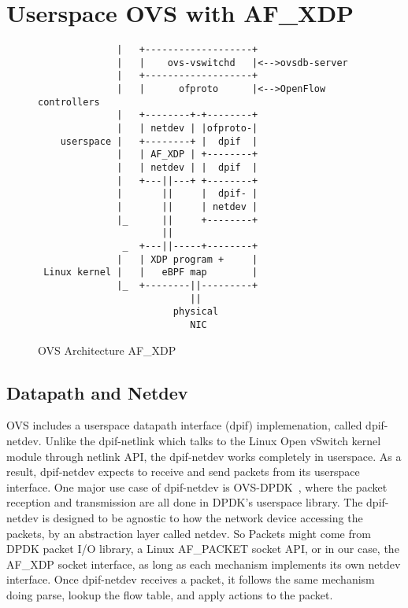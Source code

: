 \documentclass[10pt]{sigplanconf}
\begin{document}
\section{Userspace OVS with AF\_XDP}
\begin{figure}
{\scriptsize
\begin{verbatim}
              |   +-------------------+
              |   |    ovs-vswitchd   |<-->ovsdb-server
              |   +-------------------+
              |   |      ofproto      |<-->OpenFlow controllers
              |   +--------+-+--------+ 
              |   | netdev | |ofproto-|
    userspace |   +--------+ |  dpif  |
              |   | AF_XDP | +--------+
              |   | netdev | |  dpif  |
              |   +---||---+ +--------+
              |       ||     |  dpif- |
              |       ||     | netdev |
              |_      ||     +--------+  
                      ||         
               _  +---||-----+--------+
              |   | XDP program +     |
 Linux kernel |   |   eBPF map        |
              |_  +--------||---------+
                           ||
                        physical
                           NIC
\end{verbatim}
}
\vspace{-1.0em}
\caption{OVS Architecture AF\_XDP}
\label{ovsafxdp}
\vspace{-1.0em}
\end{figure}

\subsection{Datapath and Netdev}
OVS includes a userspace datapath interface (dpif) implemenation, called dpif-netdev.
Unlike the dpif-netlink which talks to the Linux Open vSwitch kernel
module through netlink API, the dpif-netdev works completely in userspace.
As a result, dpif-netdev expects to receive and send packets from its userspace
interface.  One major use case of dpif-netdev is OVS-DPDK~\cite{ovsdpdk},
where the packet reception and transmission are all done in DPDK's userspace
library. The dpif-netdev is designed to be agnostic to how the network
device accessing the packets, by an abstraction layer called netdev.
So Packets might come from DPDK packet I/O library,
a Linux AF\_PACKET socket API, or in our case, the AF\_XDP socket interface,
as long as each mechanism implements its own netdev interface.
Once dpif-netdev receives a packet, it follows the same mechanism doing
parse, lookup the flow table, and apply actions to the packet.
\end{document}
